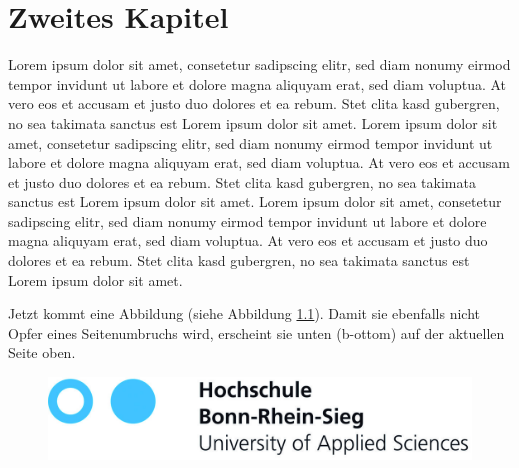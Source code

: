 \chapter{Zweites Kapitel}
Lorem ipsum dolor sit amet, consetetur sadipscing elitr, sed diam nonumy eirmod tempor invidunt ut labore et dolore magna aliquyam erat, sed diam voluptua. At vero eos et accusam et justo duo dolores et ea rebum. Stet clita kasd gubergren, no sea takimata sanctus est Lorem ipsum dolor sit amet. Lorem ipsum dolor sit amet, consetetur sadipscing elitr, sed diam nonumy eirmod tempor invidunt ut labore et dolore magna aliquyam erat, sed diam voluptua. At vero eos et accusam et justo duo dolores et ea rebum. Stet clita kasd gubergren, no sea takimata sanctus est Lorem ipsum dolor sit amet. Lorem ipsum dolor sit amet, consetetur sadipscing elitr, sed diam nonumy eirmod tempor invidunt ut labore et dolore magna aliquyam erat, sed diam voluptua. At vero eos et accusam et justo duo dolores et ea rebum. Stet clita kasd gubergren, no sea takimata sanctus est Lorem ipsum dolor sit amet.

Jetzt kommt eine Abbildung (siehe Abbildung \ref{figure01}). Damit sie ebenfalls nicht Opfer eines Seitenumbruchs wird, erscheint sie unten (b-ottom) auf der aktuellen Seite oben.

\begin{figure}[b]

\begin{center}
  	\includegraphics[scale=1]{images/Logo_H-BRS.jpg}
\end{center}

\label{figure01}
\end{figure} 

